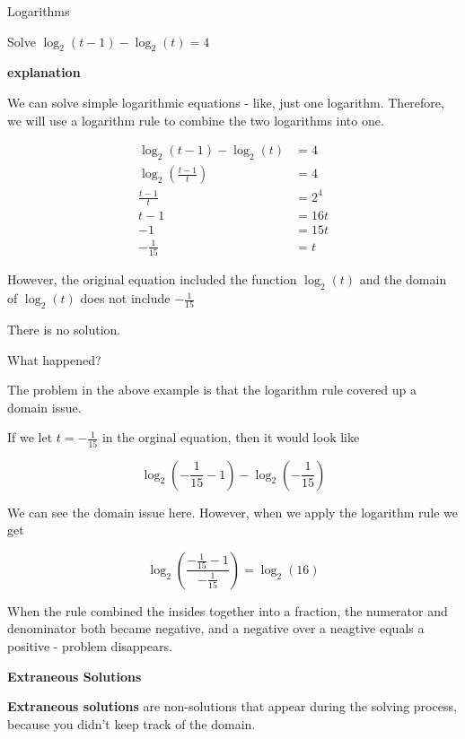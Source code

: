 \documentclass{ximera}
\begin{document}
\begin{example} Logarithms


Solve $\log_2(t-1) - \log_2(t) = 4$


\textbf{\textcolor{red!75!green}{explanation}} 


We can solve simple logarithmic equations - like, just one logarithm.  Therefore, we will use a logarithm rule to combine the two logarithms into one.




\begin{align*}
\log_2(t-1) - \log_2(t) & = 4   \\
\log_2 \left( \frac{t-1}{t} \right)  & = 4  \\
\frac{t-1}{t} & = 2^4  \\
 t-1 & = 16t  \\
-1 & = 15t  \\
-\frac{1}{15} & = t
\end{align*}



However, the original equation included the function $\log_2(t)$ and the domain of $\log_2(t)$ does not include $-\frac{1}{15}$


There is no solution.



\end{example}


What happened?


The problem in the above example is that the logarithm rule covered up a domain issue.

If we let $t = -\frac{1}{15}$ in the orginal equation, then it would look like 


\[    \log_2\left(-\frac{1}{15}-1\right) - \log_2\left(-\frac{1}{15}\right)   \]

We can see the domain issue here.  However, when we apply the logarithm rule we get



\[   \log_2\left(\frac{-\frac{1}{15}-1}{-\frac{1}{15}}\right)    = \log_2(16)  \]


When the rule combined the insides together into a fraction, the numerator and denominator both became negative, and a negative over a neagtive equals a positive - problem disappears.





\begin{definition}  \textbf{\textcolor{green!50!black}{Extraneous Solutions}}

\textbf{Extraneous solutions} are non-solutions that appear during the solving process, because you didn't keep track of the domain.

\end{definition}
\end{document}
